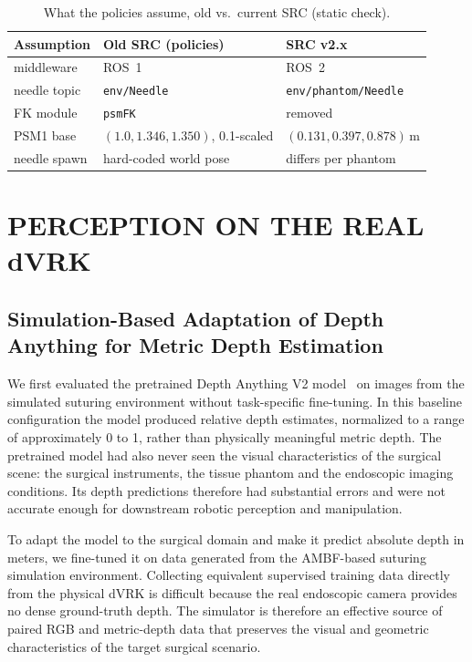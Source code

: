 \documentclass[letterpaper, 10 pt, conference]{ieeeconf}  %
\begin{document}
\begin{table}[t]
\caption{What the policies assume, old vs.\ current SRC (static check).}
\label{tab:scenes}
\centering\footnotesize
\setlength{\tabcolsep}{3pt}
\begin{tabular}{@{}p{}p{}p{}@{}}
\toprule
Assumption & Old SRC (policies) & SRC v2.x \\
\midrule
middleware & ROS~1 & ROS~2 \\
needle topic & \texttt{env/Needle} & \texttt{env/phantom/Needle} \\
FK module & \texttt{psmFK} & removed \\
PSM1 base & $(1.0,1.346,1.350)$, 0.1-scaled & $(0.131,0.397,0.878)$\,m \\
needle spawn & hard-coded world pose & differs per phantom \\
\bottomrule
\end{tabular}
\end{table}


\section{PERCEPTION ON THE REAL dVRK}
\label{sec:perception}

\subsection{Simulation-Based Adaptation of Depth Anything for Metric Depth Estimation}
We first evaluated the pretrained Depth Anything V2 model~\cite{yang2024depthv2}
on images from the simulated suturing environment without task-specific
fine-tuning. In this baseline configuration the model produced relative depth
estimates, normalized to a range of approximately 0 to 1, rather than
physically meaningful metric depth. The pretrained model had also never seen
the visual characteristics of the surgical scene: the surgical instruments, the
tissue phantom and the endoscopic imaging conditions. Its depth predictions
therefore had substantial errors and were not accurate enough for downstream
robotic perception and manipulation.

To adapt the model to the surgical domain and make it predict absolute depth
in meters, we fine-tuned it on data generated from the AMBF-based suturing
simulation environment. Collecting equivalent supervised training data directly
from the physical dVRK is difficult because the real endoscopic camera provides
no dense ground-truth depth. The simulator is therefore an effective source of
paired RGB and metric-depth data that preserves the visual and geometric
characteristics of the target surgical scenario.
\end{document}
